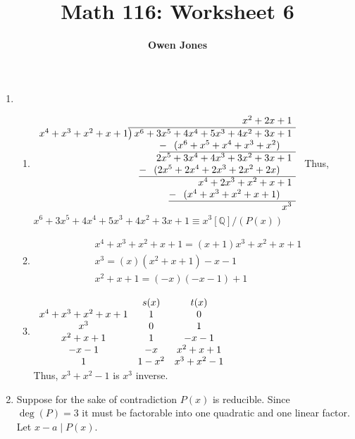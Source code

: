\documentclass[10pt]{article}
\title{\bf Math 116: Worksheet 6}
\author{\bf Owen Jones}
\begin{document}
\maketitle
\begin{enumerate}
    \item \begin{enumerate}
        \item  $\begin{array}{r}
                x^2+2x+1\phantom{)}   \\
                x^4+x^3+x^2+x+1{\overline{\smash{\big)}\,x^6+3x^5+4x^4+5x^3+4x^2+3x+1\phantom{)}}}\\
                \underline{-~\phantom{(}(x^6+x^5+x^4+x^3+x^2)\phantom{-b)}}\\
                2x^5+3x^4+4x^3+3x^2+3x+1\phantom{)}\\ 
                \underline{-~\phantom{(}(2x^5+2x^4+2x^3+2x^2+2x)\phantom{-b)}}\\
                x^4+2x^3+x^2+x+1\phantom{)}\\
                \underline{-~\phantom{(}(x^4+x^3+x^2+x+1)\phantom{-b)}}\\
                x^3\phantom{)}\\
                \end{array}$
                Thus, $x^6+3x^5+4x^4+5x^3+4x^2+3x+1\equiv x^3[\mathbb{Q}]/(P(x))$
        \item \begin{align*}
            &x^4+x^3+x^2+x+1=(x+1)x^3+x^2+x+1\\
            &x^3=(x)(x^2+x+1)-x-1\\
            &x^2+x+1=(-x)(-x-1)+1
        \end{align*}  
        \item $\begin{array}{c c c}
            & s(x) & t(x)\\
            x^4+x^3+x^2+x+1 & 1 & 0\\
            x^3 & 0 & 1\\
            x^2+x+1 & 1 & -x-1\\
            -x-1 & -x & x^2+x+1\\
            1 & 1-x^2 & x^3+x^2-1
        \end{array}$\\
Thus, $x^3+x^2-1$ is $x^3$ inverse.
    \end{enumerate}
    \item Suppose for the sake of contradiction $P(x)$ is reducible. Since $\deg(P)=3$ it must be factorable into one quadratic and one linear factor.\\
    Let $x-a\mid P(x)$. 
\end{enumerate}
\end{document}
